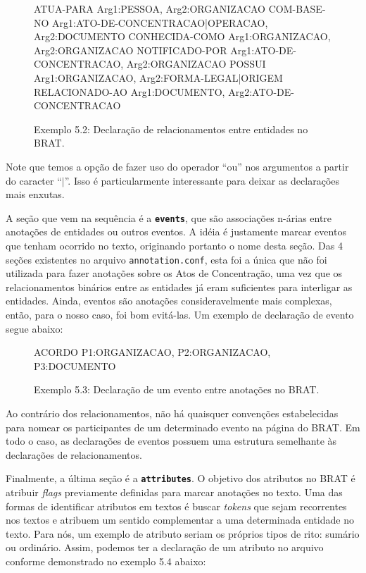 \documentclass[11pt]{report}
\newcommand{\quotes}[1]{``#1''}
\begin{document}
\begin{figure}[h!]
\centering
\begin{boxedverbatim}
[relations]

ATUA-PARA       Arg1:PESSOA, Arg2:ORGANIZACAO
COM-BASE-NO     Arg1:ATO-DE-CONCENTRACAO|OPERACAO, Arg2:DOCUMENTO
CONHECIDA-COMO  Arg1:ORGANIZACAO, Arg2:ORGANIZACAO
NOTIFICADO-POR  Arg1:ATO-DE-CONCENTRACAO, Arg2:ORGANIZACAO
POSSUI          Arg1:ORGANIZACAO, Arg2:FORMA-LEGAL|ORIGEM
RELACIONADO-AO  Arg1:DOCUMENTO, Arg2:ATO-DE-CONCENTRACAO
\end{boxedverbatim}
\caption*{Exemplo 5.2: Declaração de relacionamentos entre entidades no BRAT.}
\end{figure}

Note que temos a opção de fazer uso do operador \quotes{ou} nos argumentos a partir do caracter \quotes{$\vert$}. Isso é particularmente interessante para deixar as
declarações mais enxutas.

A seção que vem na sequência é a \textbf{\texttt{events}}, que são associações n-árias entre anotações de entidades ou outros eventos. A idéia é justamente marcar eventos que
tenham ocorrido no texto, originando portanto o nome desta seção. Das 4 seções existentes no arquivo \texttt{annotation.conf}, esta foi a única que não foi utilizada para
fazer anotações sobre os Atos de Concentração, uma vez que os relacionamentos binários entre as entidades já eram suficientes para interligar as entidades. Ainda, eventos
são anotações consideravelmente mais complexas, então, para o nosso caso, foi bom evitá-las. Um exemplo de declaração de evento segue abaixo:

\begin{figure}[h!]
\centering
\begin{boxedverbatim}
[events]

ACORDO  P1:ORGANIZACAO, P2:ORGANIZACAO, P3:DOCUMENTO
\end{boxedverbatim}
\caption*{Exemplo 5.3: Declaração de um evento entre anotações no BRAT.}
\end{figure}

Ao contrário dos relacionamentos, não há quaisquer convenções estabelecidas para nomear os participantes de um determinado evento na página do BRAT. Em todo o caso, as declarações
de eventos possuem uma estrutura semelhante às declarações de relacionamentos.

Finalmente, a última seção é a \textbf{\texttt{attributes}}. O objetivo dos atributos no BRAT é atribuir \textit{flags} previamente definidas para marcar anotações no texto.
Uma das formas de identificar atributos em textos é buscar \textit{tokens} que sejam recorrentes nos textos e atribuem um sentido complementar a uma determinada entidade no texto.
Para nós, um exemplo de atributo seriam os próprios tipos de rito: sumário ou ordinário. Assim, podemos ter a declaração de um atributo no arquivo conforme demonstrado no exemplo
5.4 abaixo:
\end{document}
